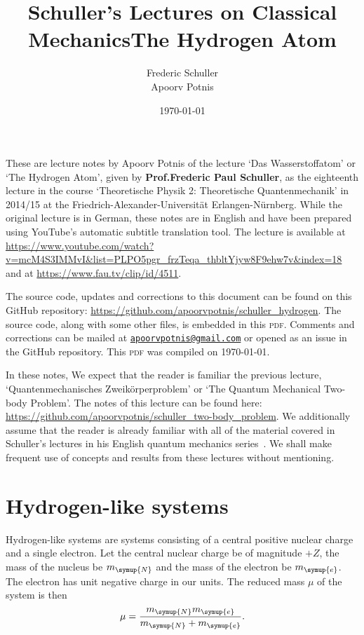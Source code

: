 \documentclass[a4 paper, 12pt]{article}
\title{Schuller's Lectures on Classical Mechanics}
\author{Frederic Schuller\\Apoorv Potnis}
\date{\today}
\title{The Hydrogen Atom}
\author{}
\date{\vspace{-5ex}}
\theoremstyle{definition}
\newcommand{\me}{m_{\symup{e}}}
\newcommand{\mn}{m_{\symup{N}}}
\begin{document}
    \maketitle

    These are lecture notes by Apoorv Potnis of the lecture `Das Wasserstoffatom' or `The Hydrogen Atom', given by \textbf{Prof.\@ Frederic Paul Schuller}, as the eighteenth lecture in the course `Theoretische Physik 2: Theoretische Quantenmechanik' in 2014/15 at the Friedrich-Alexander-Universität Erlangen-Nürnberg. While the original lecture is in German, these notes are in English and have been prepared using YouTube's automatic subtitle translation tool. The lecture is available at \url{https://www.youtube.com/watch?v=mcM4S3IMMvI&list=PLPO5pgr_frzTeqa_thbltYjyw8F9ehw7v&index=18} and at \url{https://www.fau.tv/clip/id/4511}.

    The source code, updates and corrections to this document can be found on this GitHub repository: \url{https://github.com/apoorvpotnis/schuller_hydrogen}. The source code, along with some other files, is embedded in this \textsc{pdf}. Comments and corrections can be mailed at \href{mailto:apoorvpotnis@gmail.com}{\texttt{apoorvpotnis@gmail.com}} or opened as an issue in the GitHub repository. This \textsc{pdf} was compiled on \today.

    In these notes, We expect that the reader is familiar the previous lecture, `Quantenmechanisches Zweikörperproblem' or `The Quantum Mechanical Two-body Problem'. The notes of this lecture can be found here: \url{https://github.com/apoorvpotnis/schuller_two-body_problem}. We additionally assume that the reader is already familiar with all of the material covered in Schuller's lectures in his English quantum mechanics series~\cite{SchullerVideos, Schuller}. We shall make frequent use of concepts and results from these lectures without mentioning.

    \tableofcontents

    \section{Hydrogen-like systems}
    
    Hydrogen-like systems are systems consisting of a central positive nuclear charge and a single electron. Let the central nuclear charge be of magnitude \(+Z\), the mass of the nucleus be \(m_{\symup{N}}\) and the mass of the electron be \(m_{\symup{e}}\). The electron has unit negative charge in our units. The reduced mass \(\mu\) of the system is then \[\mu = \frac{\mn\me}{\mn + \me}.\]

    \nocite{*}
    \printbibliography[heading=bibintoc]
\end{document}

